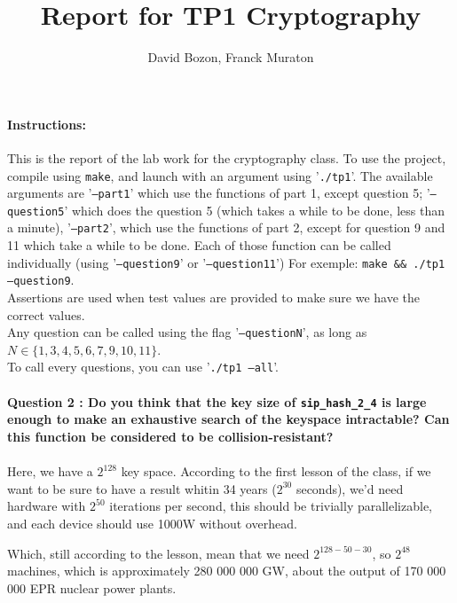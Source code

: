 \documentclass[4apaper]{report}
\author{David Bozon, Franck Muraton}
\begin{document}
\title{Report for TP1 Cryptography}
\maketitle

\paragraph{Instructions: \\} This is the report of the lab work for the cryptography class. To use the project, compile using \texttt{make}, and launch with an argument using '\texttt{./tp1}'. The available arguments are '\texttt{--part1}' which use the functions of part 1, except question 5; '\texttt{--question5}' which does the question 5 (which takes a while to be done, less than a minute), '\texttt{--part2}', which use the functions of part 2, except for question 9 and 11 which take a while to be done. Each of those function can be called individually (using '\texttt{--question9}' or '\texttt{--question11}') For exemple: \texttt{make \&\& ./tp1 --question9}. \\ Assertions are used when test values are provided to make sure we have the correct values. \\Any question can be called using the flag '\texttt{--questionN}', as long as $N \in \{1,3,4,5,6,7,9,10,11\}$. \\To call every questions, you can use '\texttt{./tp1 --all}'.

\paragraph{Question 2 : Do you think that the key size of \texttt{sip\_hash\_2\_4} is large enough to make an exhaustive search of the keyspace intractable? Can this function be considered to be collision-resistant?}

\paragraph{}Here, we have a $2^{128}$ key space. According to the first lesson of the class, if we want to be sure to have a result whitin 34 years ($2^{30}$ seconds), we'd need hardware with $2^{50}$ iterations per second, this should be trivially parallelizable, and each device should use 1000W without overhead.

Which, still according to the lesson, mean that we need $2^{128-50-30}$, so $2^{48}$ machines, which is approximately 280 000 000 GW, about the output of 170 000 000 EPR nuclear power plants.
\end{document}
